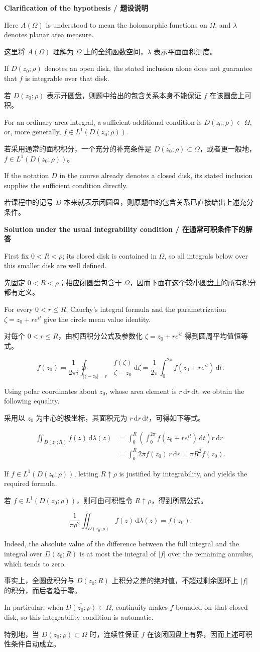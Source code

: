 \documentclass[11pt,a4paper]{ctexart}
\newcommand{\pair}[2]{\par\noindent #1\par\nopagebreak[3]\noindent #2\par}
\newcommand{\heading}[2]{\par\medskip\textbf{#1 / #2}\par\nopagebreak[4]}
\newcommand{\dd}{\,\mathrm d}
\begin{document}
\heading{Clarification of the hypothesis}{题设说明}
\pair{Here $A(\Omega)$ is understood to mean the holomorphic functions on $\Omega$, and $\lambda$ denotes planar area measure.}{这里将 $A(\Omega)$ 理解为 $\Omega$ 上的全纯函数空间，$\lambda$ 表示平面面积测度。}
\pair{If $D(z_0;\rho)$ denotes an open disk, the stated inclusion alone does not guarantee that $f$ is integrable over that disk.}{若 $D(z_0;\rho)$ 表示开圆盘，则题中给出的包含关系本身不能保证 $f$ 在该圆盘上可积。}
\pair{For an ordinary area integral, a sufficient additional condition is $\overline{D(z_0;\rho)}\subset\Omega$, or, more generally, $f\in L^1(D(z_0;\rho))$.}{若采用通常的面积积分，一个充分的补充条件是 $\overline{D(z_0;\rho)}\subset\Omega$，或者更一般地，$f\in L^1(D(z_0;\rho))$。}
\pair{If the notation $D$ in the course already denotes a closed disk, its stated inclusion supplies the sufficient condition directly.}{若课程中的记号 $D$ 本来就表示闭圆盘，则原题中的包含关系已直接给出上述充分条件。}

\heading{Solution under the usual integrability condition}{在通常可积条件下的解答}
\pair{First fix $0<R<\rho$; its closed disk is contained in $\Omega$, so all integrals below over this smaller disk are well defined.}{先固定 $0<R<\rho$；相应闭圆盘包含于 $\Omega$，因而下面在这个较小圆盘上的所有积分都有定义。}
\pair{For every $0<r\le R$, Cauchy's integral formula and the parametrization $\zeta=z_0+re^{it}$ give the circle mean value identity.}{对每个 $0<r\le R$，由柯西积分公式及参数化 $\zeta=z_0+re^{it}$ 得到圆周平均值恒等式。}
\[
f(z_0)=\frac{1}{2\pi i}\oint_{|\zeta-z_0|=r}
\frac{f(\zeta)}{\zeta-z_0}\dd\zeta
=\frac{1}{2\pi}\int_0^{2\pi} f(z_0+re^{it})\dd t.
\]
\pair{Using polar coordinates about $z_0$, whose area element is $r\,\mathrm dr\,\mathrm dt$, we obtain the following equality.}{采用以 $z_0$ 为中心的极坐标，其面积元为 $r\,\mathrm dr\,\mathrm dt$，可得如下等式。}
\begin{align*}
\iint_{D(z_0;R)} f(z)\dd\lambda(z)
&=\int_0^R\left(\int_0^{2\pi}f(z_0+re^{it})\dd t\right)r\dd r\\
&=\int_0^R2\pi f(z_0)\,r\dd r
=\pi R^2 f(z_0).
\end{align*}
\pair{If $f\in L^1(D(z_0;\rho))$, letting $R\uparrow\rho$ is justified by integrability, and yields the required formula.}{若 $f\in L^1(D(z_0;\rho))$，则可由可积性令 $R\uparrow\rho$，得到所需公式。}
\[
\boxed{\frac{1}{\pi\rho^2}\iint_{D(z_0;\rho)}f(z)\dd\lambda(z)=f(z_0).}
\]
\pair{Indeed, the absolute value of the difference between the full integral and the integral over $D(z_0;R)$ is at most the integral of $|f|$ over the remaining annulus, which tends to zero.}{事实上，全圆盘积分与 $D(z_0;R)$ 上积分之差的绝对值，不超过剩余圆环上 $|f|$ 的积分，而后者趋于零。}
\pair{In particular, when $\overline{D(z_0;\rho)}\subset\Omega$, continuity makes $f$ bounded on that closed disk, so this integrability condition is automatic.}{特别地，当 $\overline{D(z_0;\rho)}\subset\Omega$ 时，连续性保证 $f$ 在该闭圆盘上有界，因而上述可积性条件自动成立。}
\end{document}

